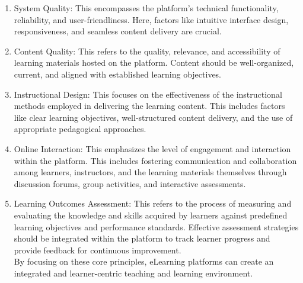 \documentclass[a4paper,12pt]{article}  %
\begin{document}
\begin{enumerate}
      \item System Quality: This encompasses the platform's technical functionality,
            reliability, and user-friendliness. Here, factors like intuitive interface
            design, responsiveness, and seamless content delivery are crucial.\\
      \item Content Quality: This refers to the quality, relevance, and accessibility of
            learning materials hosted on the platform. Content should be well-organized,
            current, and aligned with established learning objectives.\\
      \item Instructional Design: This focuses on the effectiveness of the instructional
            methods employed in delivering the learning content. This includes factors like
            clear learning objectives, well-structured content delivery, and the use of
            appropriate pedagogical approaches.\\
      \item Online Interaction: This emphasizes the level of engagement and interaction
            within the platform. This includes fostering communication and collaboration
            among learners, instructors, and the learning materials themselves through
            discussion forums, group activities, and interactive assessments.\\
      \item Learning Outcomes Assessment: This refers to the process of measuring and
            evaluating the knowledge and skills acquired by learners against predefined
            learning objectives and performance standards. Effective assessment strategies
            should be integrated within the platform to track learner progress and provide
            feedback for continuous improvement.\\

            By focusing on these core principles, eLearning platforms can create an
            integrated and learner-centric teaching and learning environment.
\end{enumerate}
\end{document}

